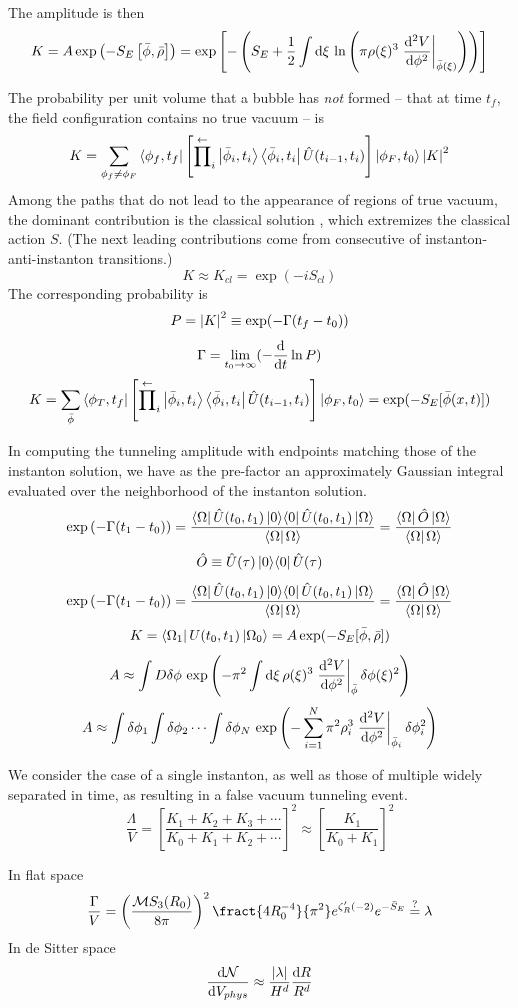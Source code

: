 The amplitude is then
\[ K = A \exp \left(-S_E \left[\bar\phi,\bar\rho \right] \right) = \exp \left[ - \left(S_E + \frac12 \int \mathrm d \xi \, \ln \left(\pi\rho(\xi)^3 \left. \frac{\mathrm d ^2V}{\mathrm d \phi^2} \right\rvert_{\bar\phi(\xi)} \right) \right) \right] \]


The probability per unit volume that a bubble has {\it not} formed -- that at time $t_f$, the field configuration contains no true vacuum -- is
\[ K = \sum_{\phi_f \neq \phi_F} \left\langle \phi_f,t_f \right\rvert \left[ \overset\leftarrow\prod_i \left\lvert \bar\phi_i,t_i \right\rangle\left\langle \bar\phi_i,t_i \right\rvert \hat U(t_{i-1},t_i) \right] \left\lvert \phi_F,t_0 \right\rangle \left\lvert K \right\rvert^2 \]
Among the paths that do not lead to the appearance of regions of true vacuum, the dominant contribution is the classical solution , which extremizes the classical action $S$.  (The next leading contributions come from consecutive of instanton-anti-instanton transitions.)
\[ K \approx K_{cl} = \exp(-i S_{cl}) \] 
The corresponding probability is
\[ P = \left\lvert K \right\rvert^2 \equiv \exp(-\Gamma (t_f - t_0) ) \]
\[ \Gamma = \lim_{t_0 \to \infty} (- \frac{\mathrm d }{\mathrm d t} \ln P) \]
\[ K = \sum_{\bar\phi} \left\langle \phi_T,t_f \right\rvert \left[ \overset\leftarrow\prod_i \left\lvert \bar\phi_i,t_i \right\rangle\left\langle \bar\phi_i,t_i \right\rvert \hat U(t_{i-1},t_i) \right] \left\lvert \phi_F,t_0 \right\rangle = \exp(-S_E[\bar\phi(x,t)]) \]

In computing the tunneling amplitude with endpoints matching those of the instanton solution, we have as the pre-factor an approximately Gaussian integral evaluated over the neighborhood of the instanton solution.
\[ \exp \left(-\Gamma (t_1 - t_0) \right) = \frac{\bra{\Omega} \hat U(t_0,t_1) \ket{0} \! \bra{0} \hat U(t_0,t_1) \ket{\Omega}}{\braket{\Omega}{\Omega}} = \frac{\bra{\Omega} \hat O \ket{\Omega}}{\braket{\Omega}{\Omega}} \]
\[ \hat O \equiv \hat U(\tau) \left\lvert 0 \right\rangle \! \left\langle 0 \right\rvert \hat U(\tau) \]
\[ \exp \left(-\Gamma (t_1 - t_0) \right) = \frac{\bra{\Omega} \hat U(t_0,t_1) \ket{0} \! \bra{0} \hat U(t_0,t_1) \ket{\Omega}}{\braket{\Omega}{\Omega}} = \frac{\bra{\Omega} \hat O \ket{\Omega}}{\braket{\Omega}{\Omega}} \]
\[ K = \left\langle \Omega_1 \right\rvert U(t_0,t_1) \left\lvert \Omega_0 \right\rangle = A \exp(-S_E[\bar\phi,\bar\rho]) \]
\[ A \approx \int D\delta\phi \, \exp \left(- \pi^2 \int \mathrm d\xi \, \rho(\xi)^3 \left. \frac{\mathrm d ^2V}{\mathrm d \phi^2} \right\rvert_{\bar\phi} \delta\phi(\xi)^2 \right) \]
\[ A \approx \int \delta\phi_1 \int \delta\phi_2 \cdots \int \delta\phi_N \, \exp \left(- \sum_{i=1}^N \pi^2 \rho_i^3 \left. \frac{\mathrm d ^2V}{\mathrm d \phi^2} \right\rvert_{\bar\phi_i} \delta\phi_i^2 \right) \]

We consider the case of a single instanton, as well as those of multiple widely separated in time, as resulting in a false vacuum tunneling event.
\[ \frac{\Lambda}{V} = \left[ \frac{K_1 + K_2 + K_3 + \cdots}{K_0 + K_1 + K_2 + \cdots} \right]^2 \approx \left[ \frac{K_1}{K_0 + K_1} \right]^2 \]

In flat space
\[ \frac{\Gamma}{V} = \left( \frac{\mathcal M S_3(R_0)}{8\pi} \right)^2 \fract{4 R_0^{-4}}{\pi^2} e^{\zeta'_{R}(-2)} e^{-\bar S_E} \overset?= \lambda \]
In de Sitter space
\[ \frac{\mathrm d \mathcal N}{\mathrm d V_{phys}} \approx \frac{\left\lvert \lambda \right\rvert}{H^d} \frac{\mathrm d R}{R^d} \]